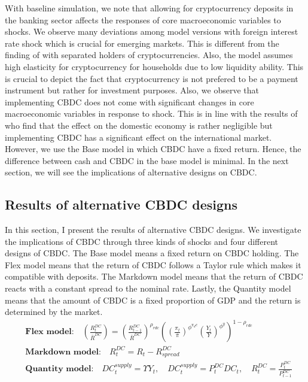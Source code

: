 \documentclass[12pt, a4paper]{article}
\begin{document}
With baseline simulation, we note that allowing for cryptocurrency deposits in the banking sector affects the responses of core macroeconomic variables to shocks. We observe many deviations among model versions with foreign interest rate shock which is crucial for emerging markets. This is different from the finding of \cite{murakami2021cryptocurrencies} with separated holders of cryptocurrencies. Also, the model assumes high elasticity for cryptocurrency for households due to low liquidity ability. This is crucial to depict the fact that cryptocurrency is not prefered to be a payment instrument but rather for investment purposes.  Also, we observe that implementing CBDC does not come with significant changes in core macroeconomic variables in response to shock. This is in line with the results of \cite{minesso2022central} who find that the effect on the domestic economy is rather negligible but implementing CBDC has a significant effect on the international market. However, we use the Base model in which CBDC have a fixed return. Hence, the difference between cash and CBDC in the base model is minimal. In the next section, we will see the implications of alternative designs on CBDC.


\subsection{Results of alternative CBDC designs}
In this section, I present the results of alternative CBDC designs. We investigate the implications of CBDC through three kinds of shocks and four different designs of CBDC. The Base model means a fixed return on CBDC holding. The Flex model means that the return of CBDC follows a Taylor rule which makes it compatible with deposits. The Markdown model means that the return of CBDC reacts with a constant spread to the nominal rate. Lastly, the Quantity model means that the amount of CBDC is a fixed proportion of GDP and the return is determined by the market. 
\begin{align*}
    &\textbf{Flex model:}\quad \left(\frac{{{R}_{t}^{DC}}}{{\bar R^{DC}}}\right)=  \left(\frac{{{R}_{t-1}^{DC}}}{{\bar R^{DC}}}\right)^{\rho_{rdc}} \left(\left(\frac{\pi_t}{\bar \pi}\right)^{\phi^{\pi_dc}} \left(\frac{Y_t}{Y}\right)^{\phi^y}\right)^{1-\rho_{rdc}}\\ 
     &\textbf{Markdown model:} \quad {R}_{t}^{DC}=R_t -{R}_{spread}^{DC} \\
     & \textbf{Quantity model:} \quad DC_t^{supply} = \Upsilon Y_t, \quad DC_t^{supply} = P_t^{DC} DC_t , \quad {R}_{t}^{DC} = \frac{P_t^{DC}}{P_{t-1}^{DC}}
\end{align*}
\end{document}
